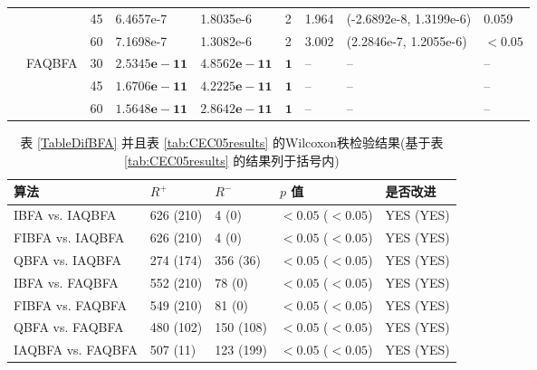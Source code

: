 \begin{longtable}[H]{p{0.3cm}p{1.2cm}p{0.3cm}p{2.45cm}p{2.45cm}p{0.5cm}p{1.2cm}p{4.5cm}p{1.5cm}}
             & &45 &6.4657e-7 & 1.8035e-6 &2 &1.964 &(-2.6892e-8, 1.3199e-6) &0.059  \\
             & &60 &7.1698e-7 & 1.3082e-6  &2 &3.002 &(2.2846e-7, 1.2055e-6) &$<0.05$ \\
 &FAQBFA &30 &$\bm{2.5345e-11}$  &$\bm{4.8562e-11}$  & $\bm{1}$&-- &-- &--  \\
             & &45 &$\bm{1.6706e-11}$ &$\bm{4.2225e-11}$   &$\bm{1}$ &-- &-- &--  \\
             & &60 &$\bm{1.5648e-11}$ &$\bm{2.8642e-11}$  & $\bm{1}$&-- &-- &--
\end{longtable}
\begin{table}[!htb]
\begin{center}
\caption{表 \ref{TableDifBFA} 并且表 \ref{tab:CEC05results} 的Wilcoxon秩检验结果(基于表 \ref{tab:CEC05results} 的结果列于括号内)}
\vspace{0.5em}\centering
\begin{tabularx}{\textwidth}{p{3.9cm}p{1.8cm}p{1.8cm}p{2.8cm}p{3.9cm}}
\hline
算法&   $R^{+}$   	&   $R^{-}$   &   $p$ 值 &是否改进\\
\midrule
IBFA vs. IAQBFA & 626 (210)   & 4 (0)   & $<0.05$ ($<0.05$)  &YES (YES)\\
FIBFA vs. IAQBFA &626 (210)     & 4  (0)  & $<0.05$ ($<0.05$) &YES (YES) \\
QBFA vs. IAQBFA & 274 (174)   & 356  (36)  &$<0.05$  ($<0.05$)  &YES (YES)\\
IBFA vs. FAQBFA &552 (210)     & 78  (0)  &$<0.05$ ($<0.05$)  &YES (YES)\\
FIBFA vs. FAQBFA &549  (210)    & 81  (0)  &$<0.05$  ($<0.05$) &YES (YES)\\
QBFA vs. FAQBFA & 480 (102)    & 150 (108)   &$<0.05$ ($<0.05$)  &YES  (YES)\\
IAQBFA vs. FAQBFA &507 (11)     &123 (199)   &$<0.05$ ($<0.05$)  &YES (YES)\\
\hline
\end{tabularx}
\label{Friedman_test}
\end{center}
\end{table}
